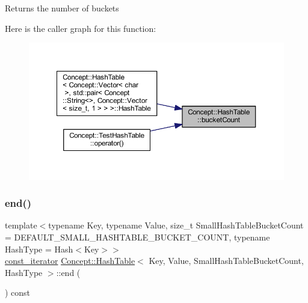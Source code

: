 \begin{DoxyReturn}{Returns}
the number of buckets 
\end{DoxyReturn}
Here is the caller graph for this function\+:\nopagebreak
\begin{figure}[H]
\begin{center}
\leavevmode
\includegraphics[width=350pt]{class_concept_1_1_hash_table_aab2236e5ef9f27eeed418a00bdea65b8_icgraph}
\end{center}
\end{figure}
\mbox{\label{class_concept_1_1_hash_table_a4621e02c1fedb16e29a88ae0b517ffd2}} 
\subsubsection{\texorpdfstring{end()}{end()}}
{\footnotesize\ttfamily template$<$typename Key, typename Value, size\+\_\+t Small\+Hash\+Table\+Bucket\+Count = D\+E\+F\+A\+U\+L\+T\+\_\+\+S\+M\+A\+L\+L\+\_\+\+H\+A\+S\+H\+T\+A\+B\+L\+E\+\_\+\+B\+U\+C\+K\+E\+T\+\_\+\+C\+O\+U\+NT, typename Hash\+Type = Hash$<$\+Key$>$$>$ \\
\mbox{\hyperlink{class_concept_1_1_hash_table_a567c99ad671a5065563483689abdf399}{const\+\_\+iterator}} \mbox{\hyperlink{class_concept_1_1_hash_table}{Concept\+::\+Hash\+Table}}$<$ Key, Value, Small\+Hash\+Table\+Bucket\+Count, Hash\+Type $>$\+::end (\begin{DoxyParamCaption}{ }\end{DoxyParamCaption}) const\hspace{0.3cm}{\ttfamily [inline]}}

